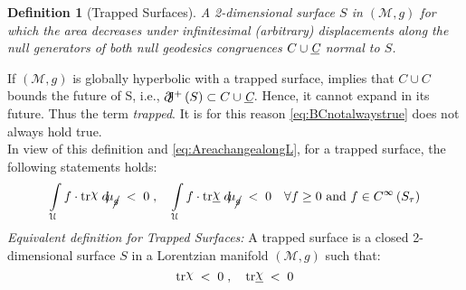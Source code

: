 \documentclass[12pt, a4paper]{report}
\theoremstyle{bfnote}
\newtheorem{definition}{Definition}[section]
\newcommand{\underit}[1]{\textit{\underbar{#1}}}
\newcommand{\chits}{\raisebox{0.5ex}{$\chi$}} %
\begin{document}
\begin{definition}[Trapped Surfaces]
A 2-dimensional surface $S$ in $\left(\mathcal{M}, g\right)$ for which the area
decreases under infinitesimal (arbitrary) displacements along the null
generators of both null geodesics congruences $C \cup \underit{C}$ normal to
$S$.
\end{definition}
If $\left(\mathcal{M}, g\right)$ is globally hyperbolic with a trapped surface,
implies that $C \cup \textit{C}$ bounds the future of S, i.e.,
$\partial\hspace{-0.3em}\mathcal{J}^+\left(S\right) \subset C \cup \underit{C}$.
Hence, it cannot expand in its future. Thus the term \textit{trapped}. It is for
this reason \eqref{eq:BCnotalwaystrue} does not always hold true.\\
In view of this definition and \eqref{eq:AreachangealongL}, for a trapped
surface, the following statements holds:
\begin{equation*}
    \int\limits_{\mathcal{U}}f\cdot\mathrm{tr}\chits\;d\hspace{-0.2em}\mu_{\cancel{g}}\; < \;0\;, \quad \int\limits_{\mathcal{U}}f\cdot\mathrm{tr}\underit{\chits}\;d\hspace{-0.2em}\mu_{\cancel{g}}\; < \;0 \quad \forall f \geq 0 \text{ and } f\in C^\infty\left(S_\tau\right)
\end{equation*}
\textit{Equivalent definition for Trapped Surfaces:} A trapped surface is a
closed 2-dimensional surface $S$ in a Lorentzian manifold $\left(\mathcal{M},
g\right)$ such that:
\begin{equation*}
    \mathrm{tr}\chits\; < \;0\;, \quad \mathrm{tr}\underit{\chits}\; < \;0
\end{equation*}
\end{document}
